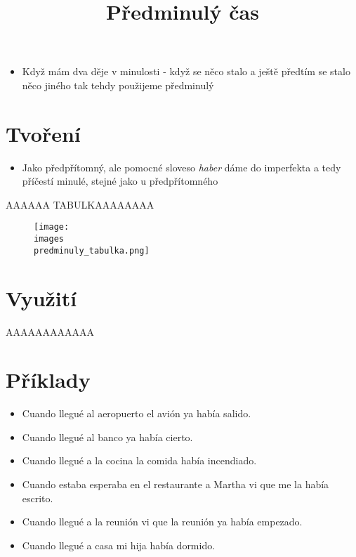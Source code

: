 \documentclass{article}
\title{\vspace{-2cm}Předminulý čas\vspace{-1.7cm}}
\date{}
\author{}
\begin{document}
\maketitle
\begin{itemize}
  \item Když mám dva děje v minulosti - když se něco stalo a ještě předtím se stalo něco jiného tak tehdy použijeme předminulý
\end{itemize}
\section{Tvoření}
\begin{itemize}
  \item Jako předpřítomný, ale pomocné sloveso \textit{haber} dáme do imperfekta a tedy příčestí minulé, stejné jako u předpřítomného
\end{itemize}
AAAAAA TABULKAAAAAAAA
\begin{figure}[h]
    \texttt{[image: \\images\\predminuly\_tabulka.png]}
    \caption{}
\end{figure}

\section{Využití}
AAAAAAAAAAAA
\section{Příklady}
\begin{itemize}
  \item Cuando llegué al aeropuerto el avión ya había salido.
  \item Cuando llegué al banco ya había cierto.
  \item Cuando llegué a la cocina la comida había incendiado.
  \item Cuando estaba esperaba en el restaurante a Martha vi que me la había escrito.
  \item Cuando llegué a la reunión vi que la reunión ya había empezado.
  \item Cuando llegué a casa mi hija había dormido.
\end{itemize}
\end{document}
